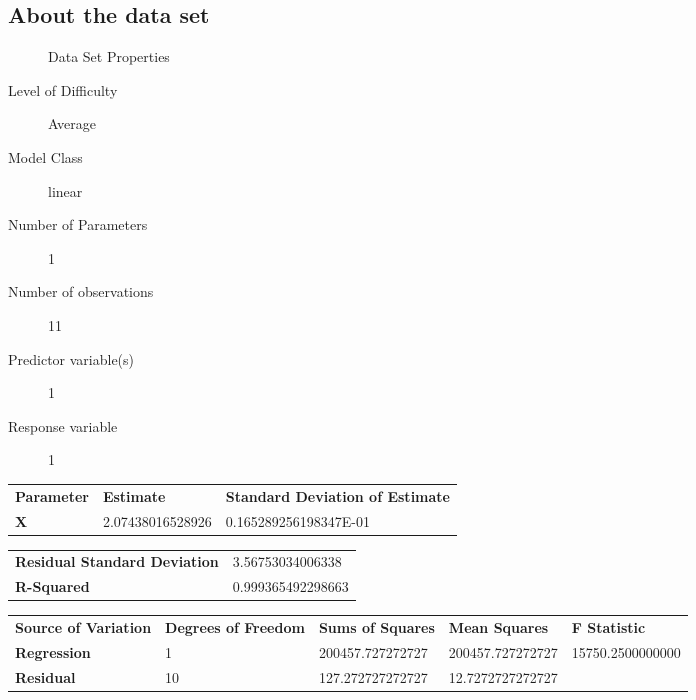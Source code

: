 \documentclass[10pt]{article}
\begin{document}
\subsection*{About the data set}

\begin{description}
   \item[]Data Set Properties
   \item[Level of Difficulty] Average
   \item[Model Class] linear
   \item[Number of Parameters] 1
   \item[Number of observations] 11
   \item[Predictor variable(s)] 1
   \item[Response variable] 1
\end{description}

\begin{tabular}{lll}
   \textbf{Parameter} & \textbf{Estimate} & \textbf{Standard Deviation of Estimate}  \\ 
	 \textbf{X} &  2.07438016528926 &  0.165289256198347E-01  \\ 
\end{tabular} 

\begin{tabular}{ll}
    \textbf{Residual Standard Deviation} &  3.56753034006338  \\ 
    \textbf{R-Squared} & 0.999365492298663   \\  
\end{tabular}


\begin{tabular}{lllll}
   \textbf{Source of Variation} & \textbf{Degrees of Freedom} & \textbf{Sums of Squares} & \textbf{Mean Squares}  & \textbf{F Statistic} \\ 
   \textbf{Regression} & 1 & 200457.727272727 & 200457.727272727 & 15750.2500000000 \\ 
	\textbf{Residual} & 10 & 127.272727272727 & 12.7272727272727 &  \\ 
\end{tabular} 
\end{document}
